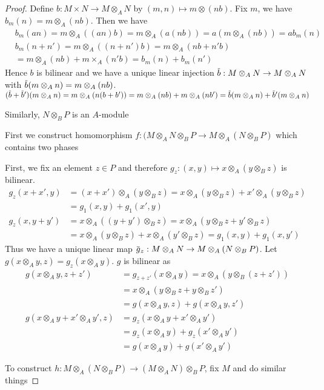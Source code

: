 \documentclass[11pt]{article}
\begin{document}
\begin{proof}
Define \(b:M\times N\to M\otimes_AN\) by \((m,n)\mapsto m\otimes(nb)\). Fix \(m\), we
have \(b_m(n)=m\otimes_A(nb)\). Then we have
\begin{align*}
&b_m(an)=m\otimes_A((an)b)=m\otimes_A(a(nb))=a(m\otimes_A(nb))=ab_m(n)\\
&b_m(n+n')=m\otimes_A((n+n')b)=m\otimes_A(nb+n'b)\\&=m\otimes_A(nb)+m\times_A(n'b)=b_m(n)+b_m(n')
\end{align*}
Hence \(b\) is bilinear and we have a unique linear injection \(\barb:M\otimes_AN\to M\otimes_AN\)
with
\(\barb(m\otimes_An)=m\otimes_A(nb)\).
\((\barb+\barb')(m\otimes_A n)=m\otimes_A(n(b+b'))=m\otimes_A(nb)+m\otimes_A(nb')=\barb(m\otimes_An)+\barb'(m\otimes_An)\)

Similarly, \(N\otimes_BP\) is an \(A\)-module

First we construct homomorphism \(f:(M\otimes_AN\otimes_BP\to M\otimes_A(N\otimes_BP)\) which contains two phases
\begin{center}\quad{}
\end{center}

First, we fix an element \(z\in P\) and therefore \(g_z:(x,y)\mapsto x\otimes_A(y\otimes_Bz)\) is bilinear.
\begin{align*}
g_z(x+x',y)&=(x+x')\otimes_A(y\otimes_Bz)=x\otimes_A(y\otimes_Bz)+x'\otimes_A(y\otimes_Bz)\\&=g_1(x,y)+g_1(x',y)\\
g_z(x,y+y')&=x\otimes_A((y+y')\otimes_Bz)=x\otimes_A(y\otimes_Bz+y'\otimes_Bz)\\&=x\otimes_A(y\otimes_Bz)+x\otimes_A(y'\otimes_Bz)=g_1(x,y)+g_1(x,y')
\end{align*}
Thus we have a unique linear map \(\barg_z:M\otimes_AN\to M\otimes_A(N\otimes_BP)\). Let
\(g(x\otimes_Ay,z)=g_z(x\otimes_Ay)\). \(g\) is bilinear as
\begin{align*}
g(x\otimes_Ay,z+z')&=g_{z+z'}(x\otimes_Ay)=x\otimes_A(y\otimes_B(z+z'))\\&=x\otimes_A(y\otimes_Bz+y\otimes_Bz')\\
&=g(x\otimes_Ay,z)+g(x\otimes_Ay,z')\\
g(x\otimes_Ay+x'\otimes_Ay',z)&=g_z(x\otimes_Ay+x'\otimes_Ay')\\&=g_z(x\otimes_Ay)+g_z(x'\otimes_Ay')\\
&=g(x\otimes_Ay)+g(x'\otimes_Ay')
\end{align*}

To construct \(h:M\otimes_A(N\otimes_BP)\to(M\otimes_AN)\otimes_BP\), fix \(M\) and do similar things
\end{proof}
\end{document}

